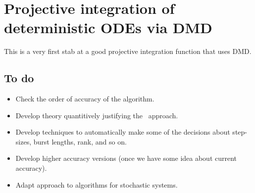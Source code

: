 \chapter{Projective integration of deterministic ODEs via DMD}
\label{sec:ProjIntDMD}
\localtableofcontents

This is a very first stab at a good projective integration function that uses DMD.







\section{To do}
\begin{itemize}
\item Check the order of accuracy of the algorithm.
\item Develop theory quantitively justifying the \dmd\ approach.
\item Develop techniques to automatically make some of the decisions about step-sizes, burst lengths, rank, and so on.
\item Develop higher accuracy versions (once we have some idea about current accuracy).
\item Adapt approach to algorithms for stochastic systems.
\end{itemize}

